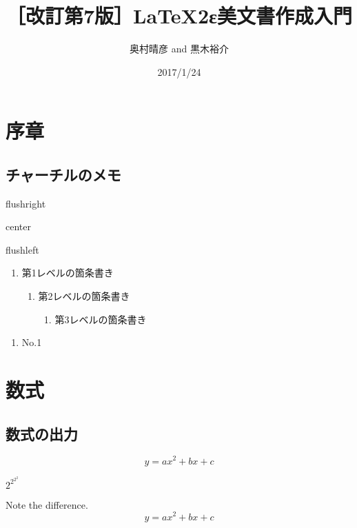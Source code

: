 \documentclass{article}
\begin{document}
\title{［改訂第7版］LaTeX2ε美文書作成入門}
\author{奥村晴彦 and 黒木裕介}
\date{2017/1/24}
\maketitle

\section{序章}
\subsection{チャーチルのメモ}
\begin{flushright}
  flushright
\end{flushright}

\begin{center}
  center
\end{center}

\begin{flushleft}
  flushleft
\end{flushleft}

\begin{enumerate}
\item 第1レベルの箇条書き
  \begin{enumerate}
  \item 第2レベルの箇条書き
    \begin{enumerate}
    \item 第3レベルの箇条書き
    \end{enumerate}
  \end{enumerate}
\end{enumerate}

\begin{enumerate}
  \item No.1
\end{enumerate}

\section{数式}
\subsection{数式の出力}


\[
 y = ax^2 + bx + c
\]

\begin{flushright}
  $2^{2^{2^{2}}}$
\end{flushright}
Note the difference.
\begin{equation}
  y = ax^2 + bx + c
\end{equation}
\end{document}
